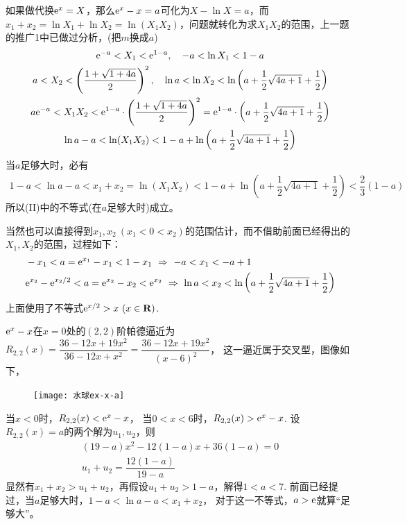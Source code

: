 \begin{enumerate}[label={【\textbf{例\thechapter.\arabic*}】},
 leftmargin=\inteval{\myenumleftmargin}pt,
 itemsep=\inteval{\myenumitempsep}pt,
 itemindent=\inteval{\myenumitemindent}pt]
如果做代换$ \mathrm{e}^x=X $，那么$ \mathrm{e}^x-x=a $可化为$ X-\ln X=a $，而$ x_1+x_2=\ln X_1+\ln X_2=\ln(X_1X_2) $，问题就转化为求$ X_1X_2 $的范围，上一题的推广1中已做过分析，(把$ m $换成$ a $)
\begin{gather*}
    \mathrm{e}^{-a}<X_1<\mathrm{e}^{1-a},\quad -a<\ln X_1<1-a \\
    a<X_2<\left(\dfrac{1+\sqrt{1+4a}}{2}\right)^2,\quad \ln a<\ln X_2<
    \ln\left(a+\dfrac{1}{2}\sqrt{4a+1}+\dfrac{1}{2}\right) \\
    a \mathrm{e}^{-a}<X_1X_2<\mathrm{e}^{1-a}\cdot \left(\dfrac{1+\sqrt{1+4a}}{2}\right)^2=
    \mathrm{e}^{1-a}\cdot \left(a+\dfrac{1}{2}\sqrt{4a+1}+\dfrac{1}{2}\right) \\
    \ln a -a <\ln(X_1X_2)<1-a+\ln\left(a+\dfrac{1}{2}\sqrt{4a+1}+\dfrac{1}{2}\right)
\end{gather*}
当$ a $足够大时，必有
\begin{gather*}
    1-a<\ln a -a <x_1+x_2=\ln(X_1X_2)<1-a+\ln\left(a+\dfrac{1}{2}
    \sqrt{4a+1}+\dfrac{1}{2}\right)<\dfrac{2}{3}(1-a)
\end{gather*} 
所以(II)中的不等式(在$ a $足够大时)成立。

当然也可以直接得到$ x_1,x_2\ (x_1<0<x_2) $的范围估计，而不借助前面已经得出的$ X_1,X_2 $的范围，过程如下：
\begin{align*}
    \begin{aligned}
        & -x_1<a=\e^{x_1}-x_1<1-x_1 \ \Rightarrow \ -a<x_1<-a+1 \\
        & \e^{x_2}-\e^{x_2/2}<a=\e^{x_2}-x_2<\e^{x_2} \ \Rightarrow \ 
        \ln a<x_2<\ln\left(a+\dfrac{1}{2}\sqrt{4a+1}+\dfrac{1}{2}\right)
    \end{aligned} 
\end{align*}
上面使用了不等式$ \mathrm{e}^{x/2}>x\ (x\in \textbf{R}) $.

$ \mathrm{e}^x-x $在$ x=0 $处的$ (2,2) $阶帕德逼近为$ R_{2,2}(x)=
\dfrac{36-12x+19x^2}{36-12x+x^2}=\dfrac{36-12x+19x^2}{(x-6)^2} $，
这一逼近属于交叉型，图像如下，
\begin{figure}[!ht]
    \centering
    \texttt{[image: 水球ex-x-a]}
\end{figure}
当$ x<0 $时，$ R_{2,2}(x)<\mathrm{e}^x-x $，
当$ 0<x<6 $时，$ R_{2,2}(x)>\mathrm{e}^x-x $. 
设$ R_{2,2}(x)=a $的两个解为$ u_1,u_2 $，则
\begin{gather*}
    (19-a)x^2-12(1-a)x+36(1-a)=0 \\
    u_1+u_2=\dfrac{12(1-a)}{19-a}
\end{gather*}
显然有$ x_1+x_2>u_1+u_2 $，再假设$ u_1+u_2>1-a $，解得$ 1<a<7 $.
前面已经提过，当$ a $足够大时，$ 1-a<\ln a-a<x_1+x_2 $，
对于这一不等式，$ a>\mathrm{e} $就算“足够大”。


\end{enumerate}

